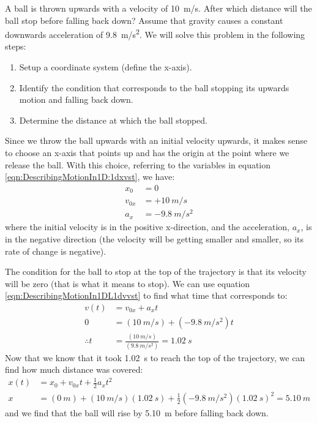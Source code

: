 \begin{example}{A ball is thrown upwards with a velocity of \SI{10}{m/s}. After which distance will the ball stop before falling back down? Assume that gravity causes a constant downwards acceleration of \SI{9.8}{m/s^2}.}
\label{ex:DescribingMotionIn1D:ballupandown}
We will solve this problem in the following steps:
\begin{enumerate}[topsep=-10pt]
\item Setup a coordinate system (define the x-axis).
\item Identify the condition that corresponds to the ball stopping its upwards motion and falling back down.
\item Determine the distance at which the ball stopped.
\end{enumerate}
Since we throw the ball upwards with an initial velocity upwards, it makes sense to choose an x-axis that points up and has the origin at the point where we release the ball. With this choice, referring to the variables in equation \ref{eqn:DescribingMotionIn1D:1dxvst}, we have:
\begin{align*}
x_0&=0\\
v_{0x}&=+\SI{10}{m/s}\\
a_x&=\SI{-9.8}{m/s^2}
\end{align*}
where the initial velocity is in the positive x-direction, and the acceleration, $a_x$, is in the negative direction (the velocity will be getting smaller and smaller, so its rate of change is negative).

The condition for the ball to stop at the top of the trajectory is that its velocity will be zero (that is what it means to stop). We can use equation \ref{eqn:DescribingMotionIn1DL1dvvst} to find what time that corresponds to:
\begin{align*}
v(t) &= v_{0x}+a_xt\\
0 &= (\SI{10}{m/s}) + (\SI{-9.8}{m/s^2})t\\
\therefore t&=\frac{(\SI{10}{m/s})}{(\SI{9.8}{m/s^2})}=\SI{1.02}{s}
\end{align*}
Now that we know that it took \SI{1.02}{s} to reach the top of the trajectory, we can find how much distance was covered:
\begin{align*}
x(t) &= x_0+v_{0x}t+ \frac{1}{2}a_xt^2\\
x &= (\SI{0}{m})+(\SI{10}{m/s})(\SI{1.02}{s})+\frac{1}{2}(\SI{-9.8}{m/s^2})(\SI{1.02}{s})^2 = \SI{5.10}{m}
\end{align*}
and we find that the ball will rise by \SI{5.10}{m} before falling back down. 
\end{example}

